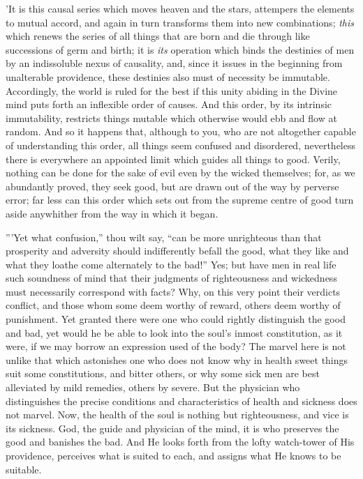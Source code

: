 'It is this causal series which moves heaven and the stars, attempers
the elements to mutual accord, and again in turn transforms them into
new combinations; \emph{this} which renews the series of all things that are
born and die through like successions of germ and birth; it is \emph{its}
operation which binds the destinies of men by an indissoluble nexus of
causality, and, since it issues in the beginning from unalterable
providence, these destinies also must of necessity be immutable.
Accordingly, the world is ruled for the best if this unity abiding in
the Divine mind puts forth an inflexible order of causes. And this
order, by its intrinsic immutability, restricts things mutable which
otherwise would ebb and flow at random. And so it happens that, although
to you, who are not altogether capable of understanding this order, all
things seem confused and disordered, nevertheless there is everywhere an
appointed limit which guides all things to good. Verily, nothing can be
done for the sake of evil even by the wicked themselves; for, as we
abundantly proved, they seek good, but are drawn out of the way by
perverse error; far less can this order which sets out from the supreme
centre of good turn aside anywhither from the way in which it began.

'''Yet what confusion,'' thou wilt say, ``can be more unrighteous than that
prosperity and adversity should indifferently befall the good, what
they like and what they loathe come alternately to the bad!'' Yes; but
have men in real life such soundness of mind that their judgments of
righteousness and wickedness must necessarily correspond with facts?
Why, on this very point their verdicts conflict, and those whom some
deem worthy of reward, others deem worthy of punishment. Yet granted
there were one who could rightly distinguish the good and bad, yet would
he be able to look into the soul's inmost constitution, as it were, if
we may borrow an expression used of the body? The marvel here is not
unlike that which astonishes one who does not know why in health sweet
things suit some constitutions, and bitter others, or why some sick men
are best alleviated by mild remedies, others by severe. But the
physician who distinguishes the precise conditions and characteristics
of health and sickness does not marvel. Now, the health of the soul is
nothing but righteousness, and vice is its sickness. God, the guide and
physician of the mind, it is who preserves the good and banishes the
bad. And He looks forth from the lofty watch-tower of His providence,
perceives what is suited to each, and assigns what He knows to be
suitable.

